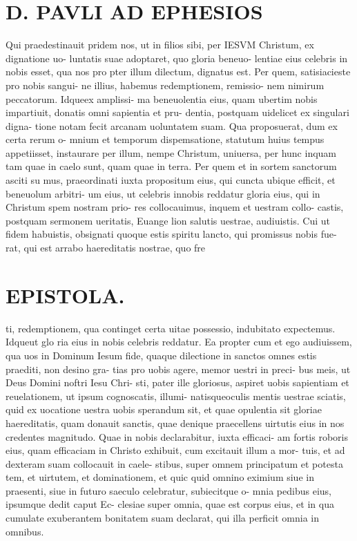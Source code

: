 \documentclass{article}
\begin{document}
\begin{pages}
\section*{D. PAVLI AD EPHESIOS }
\marginpar{[ p.3.  ]}
\marginpar{[ p.4.  ]}
\marginpar{[ p.5.  ]}
\marginpar{[ p.6.  ]}
\marginpar{[ p.7.  ]}\pstart Qui praedestinauit pridem nos, ut in filios sibi, per IESVM Christum, ex dignatione uo- luntatis suae adoptaret, quo gloria beneuo- lentiae eius celebris in nobis esset, qua nos pro pter illum dilectum, dignatus est.  \pend\pstart Per  quem, satisiacieste pro nobis sangui- ne illius, habemus redemptionem, remissio- nem nimirum peccatorum.  Idqueex amplissi- ma beneuolentia eius, quam ubertim nobis impartiuit, donatis omni sapientia et pru- dentia, postquam uidelicet ex singulari digna- tione notam fecit arcanam uoluntatem suam.  \pend\pstart Qua proposuerat, dum ex certa rerum o- mnium et temporum dispemsatione, statutum huius tempus appetiisset, instaurare per illum, nempe Christum, uniuersa, per hunc inquam tam quae in caelo sunt, quam quae in terra.  \pend\pstart Per quem et in sortem sanctorum asciti su mus, praeordinati iuxta propositum eius, qui cuncta ubique efficit, et beneuolum arbitri- um eius, ut celebris innobis reddatur gloria eius, qui in Christum spem nostram prio- res collocauimus, inquem et uestram collo- castis, postquam sermonem ueritatis, Euange lion salutis uestrae, audiuistis.  \pend\pstart Cui ut fidem habuistis, obsignati quoque estis spiritu lancto, qui promissus nobis fue- rat, qui est arrabo haereditatis nostrae, quo fre  \pend
\section*{EPISTOLA. }
\marginpar{[ p.90 ]}
\marginpar{[ p.91 ]}
\marginpar{[ p.92 ]}\pstart ti, redemptionem, qua continget certa uitae possessio, indubitato expectemus. Idqueut glo ria eius in nobis celebris reddatur.  \pend\pstart Ea propter cum et ego audiuissem, qua uos in Dominum Iesum fide, quaque dilectione in sanctos omnes estis praediti, non desino gra- tias pro uobis agere, memor uestri in preci- bus meis, ut Deus Domini noftri Iesu Chri- sti, pater ille gloriosus, aspiret uobis sapientiam et reuelationem, ut ipsum cognoscatis, illumi- natisqueoculis mentis uestrae sciatis, quid ex uocatione uestra uobis sperandum sit, et quae opulentia sit gloriae haereditatis, quam donauit sanctis, quae denique praecellens uirtutis eius in nos credentes magnitudo.  \pend\pstart Quae in nobis declarabitur, iuxta efficaci- am fortis roboris eius, quam efficaciam in Christo exhibuit, cum excitauit illum a mor- tuis, et ad dexteram suam collocauit in caele- stibus, super omnem principatum et potesta tem, et uirtutem, et dominationem, et quic quid omnino eximium siue in praesenti, siue in futuro saeculo celebratur, subiecitque o- mnia pedibus eius, ipsumque dedit caput Ec- clesiae super omnia, quae est corpus eius, et in qua cumulate exuberantem bonitatem suam declarat, qui illa perficit omnia in omnibus.  \pend

\end{pages}
\end{document}
